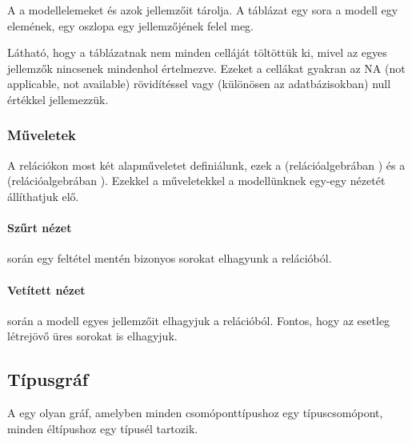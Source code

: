 \begin{definicio}
A  a modellelemeket és azok jellemzőit tárolja. A táblázat egy sora a modell egy elemének, egy oszlopa egy jellemzőjének felel meg.
\end{definicio}


Látható, hogy a táblázatnak nem minden celláját töltöttük ki, mivel az egyes jellemzők nincsenek mindenhol értelmezve. Ezeket a cellákat gyakran az \textsf{NA} (not applicable, not available) rövidítéssel vagy (különösen az adatbázisokban) \textsf{null} értékkel jellemezzük.

\subsubsection{Műveletek}

A relációkon most két alapműveletet definiálunk, ezek a  (relációalgebrában ) és a  (relációalgebrában ). Ezekkel a műveletekkel a modellünknek egy-egy nézetét állíthatjuk elő.

\paragraph{Szűrt nézet}

\begin{definicio}
	 során egy feltétel mentén bizonyos sorokat elhagyunk a relációból. 
\end{definicio}


\paragraph{Vetített nézet}

\begin{definicio}
	 során a modell egyes jellemzőit elhagyjuk a relációból. Fontos, hogy az esetleg létrejövő üres sorokat is elhagyjuk. 
\end{definicio}


\subsection{Típusgráf}

\begin{definicio}
A  egy olyan gráf, amelyben minden csomóponttípushoz egy típuscsomópont, minden éltípushoz egy típusél tartozik.
\end{definicio}

